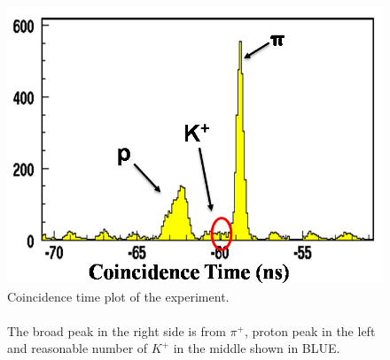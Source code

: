 \begin{figure}[!tbp]
  \centering
  \includegraphics[trim = 1mm 1mm 1mm 1mm,clip,width=0.8\columnwidth]{cointime1}
  \caption[Coincidence time plot of the experiment.]{\label{fig:cointime1}Coincidence time plot of the experiment.\\\\ The broad peak in the right side is from $\pi^+$, proton peak in the left and reasonable number of $K^+$ in the middle shown in BLUE.}
\end{figure}


